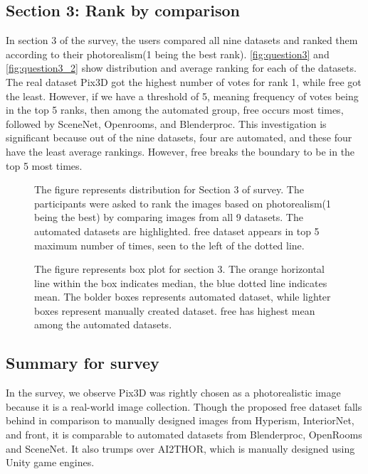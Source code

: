 \subsection{Section 3: Rank by comparison}
In section 3 of the survey, the users compared all nine datasets and ranked them according to their photorealism(1 being the best rank).
\autoref{fig:question3} and \autoref{fig:question3_2} show distribution and average ranking for each of the datasets.
The real dataset Pix3D got the highest number of votes for rank 1, while \gls{free} got the least.
However, if we have a threshold of 5, meaning frequency of votes being in the top 5 ranks, then among the automated group, \gls{free} occurs most times, followed by SceneNet, Openrooms, and Blenderproc.
This investigation is significant because out of the nine datasets, four are automated, and these four have the least average rankings.
However, \gls{free} breaks the boundary to be in the top 5 most times.

\begin{figure}
    \centering
    \resizebox{\textwidth}{!}{}
    \caption{The figure represents distribution for Section 3 of survey. The participants were asked to rank the images based on photorealism(1 being the best) by comparing images from all 9 datasets.
    The automated datasets are highlighted. \gls{free} dataset appears in top 5 maximum number of times, seen to the left of the dotted line.}
    \label{fig:question3}
\end{figure}

\begin{figure}
    \centering
    \resizebox{0.75\textwidth}{!}{}
    \caption{The figure represents box plot for section 3. The orange horizontal line within the box indicates median, the blue dotted line indicates mean.
    The bolder boxes represents automated dataset, while lighter boxes represent manually created dataset. \Gls{free} has highest mean among the automated datasets.}
    \label{fig:question3_2}
\end{figure}

\subsection{Summary for survey}
In the survey, we observe Pix3D was rightly chosen as a photorealistic image because it is a real-world image collection.
Though the proposed \gls{free} dataset falls behind in comparison to manually designed images from Hyperism, InteriorNet, and \gls{front},
it is comparable to automated datasets from Blenderproc, OpenRooms and SceneNet.
It also trumps over AI2THOR, which is manually designed using Unity game engines.

